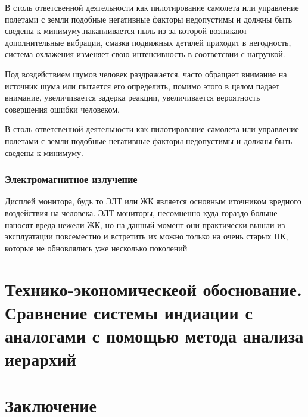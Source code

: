 \documentclass[a4paper,12pt]{report} %
\begin{document}
В столь ответсвенной деятельности как пилотирование самолета или управление
полетами с земли подобные негативные факторы недопустимы и должны быть сведены к
минимуму.накапливается пыль из-за которой возникают дополнительные вибрации,
смазка подвижных деталей приходит в негодность, система охлажения изменяет свою
интенсивность в соответсвии с нагрузкой.

Под воздействием шумов человек раздражается, часто обращает внимание на источник
шума или пытается его определить, помимо этого в целом падает внимание,
увеличивается задерка реакции, увеличивается вероятность совершения ошибки
человеком.

В столь ответсвенной деятельности как пилотирование самолета или управление
полетами с земли подобные негативные факторы недопустимы и должны быть сведены к
минимуму.
\subsection{Электромагнитное излучение}
Дисплей монитора, будь то ЭЛТ или ЖК является основным иточником вредного
воздействия на человека. ЭЛТ мониторы, несомненно куда гораздо больше наносят
вреда нежели ЖК, но на данный момент они практически вышли из эксплуатации
повсеместно и встретить их можно только на очень старых ПК, которые не
обновлялись уже несколько поколений
\newpage
\chapter{Технико-экономическеой обоснование. Сравнение системы индиации с
  аналогами с помощью метода анализа иерархий} %
\lipsum [1]
\newpage
\chapter{Заключение}
\end{document}
